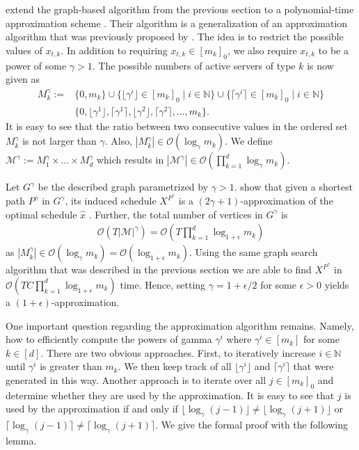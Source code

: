 \citeauthor*{Albers2021_2} extend the graph-based algorithm from the previous section to a polynomial-time approximation scheme \cite{Albers2021_2}. Their algorithm is a generalization of an approximation algorithm that was previously proposed by \citeauthor*{Kappelmann2017} \cite{Kappelmann2017}. The idea is to restrict the possible values of $x_{t,k}$. In addition to requiring $x_{t,k} \in [m_k]_0$, we also require $x_{t,k}$ to be a power of some $\gamma > 1$. The possible numbers of active servers of type $k$ is now given as \begin{align*}
    M_k^{\gamma} := &\{0, m_k\} \cup \{\lfloor\gamma^i\rfloor \in [m_k]_0 \mid i \in \mathbb{N}\} \cup \{\lceil\gamma^i\rceil \in [m_k]_0 \mid i \in \mathbb{N}\} \\
                    &\{0, \lfloor\gamma^1\rfloor, \lceil\gamma^1\rceil, \lfloor\gamma^2\rfloor, \lceil\gamma^2\rceil, \dots, m_k\}.
\end{align*} It is easy to see that the ratio between two consecutive values in the ordered set $M_k^{\gamma}$ is not larger than $\gamma$. Also, $|M_k^{\gamma}| \in \mathcal{O}(\log_{\gamma} m_k)$. We define $\mathcal{M}^{\gamma} := M_1^{\gamma} \times \dots \times M_d^{\gamma}$ which results in $|\mathcal{M}^{\gamma}| \in \mathcal{O}(\prod_{k=1}^d \log_{\gamma} m_k)$.

Let $G^{\gamma}$ be the described graph parametrized by $\gamma > 1$. \citeauthor*{Albers2021_2} show that given a shortest path $P^{\gamma}$ in $G^{\gamma}$, its induced schedule $X^{P^{\gamma}}$ is a $(2\gamma + 1)$-approximation of the optimal schedule $\hat{x}$ \cite{Albers2021_2}. Further, the total number of vertices in $G^{\gamma}$ is \begin{align*}
    \mathcal{O}(T |\mathcal{M}|^{\gamma}) = \mathcal{O}(T \prod_{k=1}^d \log_{1+\epsilon} m_k)
\end{align*} as $|M_k^{\gamma}| \in \mathcal{O}(\log_{\gamma} m_k) = \mathcal{O}(\log_{1 + \epsilon} m_k)$. Using the same graph search algorithm that was described in the previous section we are able to find $X^{P^{\gamma}}$ in $\mathcal{O}(T C \prod_{k=1}^d \log_{1 + \epsilon} m_k)$ time. Hence, setting $\gamma = 1 + \epsilon / 2$ for some $\epsilon > 0$ yields a $(1+\epsilon)$-approximation.

One important question regarding the approximation algorithm remains. Namely, how to efficiently compute the powers of gamma $\gamma^i$ where $\gamma^i \in [m_k]$ for some $k \in [d]$. There are two obvious approaches. First, to iteratively increase $i \in \mathbb{N}$ until $\gamma^i$ is greater than $m_k$. We then keep track of all $\lfloor\gamma^i\rfloor$ and $\lceil\gamma^i\rceil$ that were generated in this way. Another approach is to iterate over all $j \in [m_k]_0$ and determine whether they are used by the approximation. It is easy to see that $j$ is used by the approximation if and only if $\lfloor\log_{\gamma} (j-1)\rfloor \neq \lfloor\log_{\gamma} (j+1)\rfloor$ or $\lceil\log_{\gamma} (j-1)\rceil \neq \lceil\log_{\gamma} (j+1)\rceil$. We give the formal proof with the following lemma.


